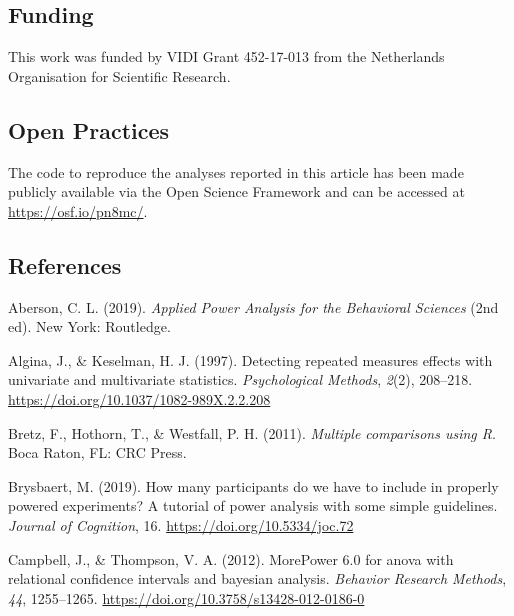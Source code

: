 \documentclass[
  english,
  ,jou,floatsintext]{apa6}
\begin{document}
\hypertarget{funding}{%
\subsection{Funding}\label{funding}}

This work was funded by VIDI Grant 452-17-013 from the Netherlands Organisation for Scientific Research.

\hypertarget{open-practices}{%
\subsection{Open Practices}\label{open-practices}}

The code to reproduce the analyses reported in this article has been made publicly available via the Open Science Framework and can be accessed at \url{https://osf.io/pn8mc/}.

\hypertarget{references}{%
\subsection{References}\label{references}}

\setlength{\parindent}{-0.5in}
\setlength{\leftskip}{0.5in}

\hypertarget{refs}{}
\leavevmode\hypertarget{ref-aberson_applied_2019}{}%
Aberson, C. L. (2019). \emph{Applied Power Analysis for the Behavioral Sciences} (2nd ed). New York: Routledge.

\leavevmode\hypertarget{ref-algina_detecting_1997}{}%
Algina, J., \& Keselman, H. J. (1997). Detecting repeated measures effects with univariate and multivariate statistics. \emph{Psychological Methods}, \emph{2}(2), 208--218. \url{https://doi.org/10.1037/1082-989X.2.2.208}

\leavevmode\hypertarget{ref-bretz_multiple_2011}{}%
Bretz, F., Hothorn, T., \& Westfall, P. H. (2011). \emph{Multiple comparisons using R}. Boca Raton, FL: CRC Press.

\leavevmode\hypertarget{ref-brysbaert_how_2019}{}%
Brysbaert, M. (2019). How many participants do we have to include in properly powered experiments? A tutorial of power analysis with some simple guidelines. \emph{Journal of Cognition}, 16. \url{https://doi.org/10.5334/joc.72}

\leavevmode\hypertarget{ref-Campbell2012MorePower6F}{}%
Campbell, J., \& Thompson, V. A. (2012). MorePower 6.0 for anova with relational confidence intervals and bayesian analysis. \emph{Behavior Research Methods}, \emph{44}, 1255--1265. \url{https://doi.org/10.3758/s13428-012-0186-0}
\end{document}
